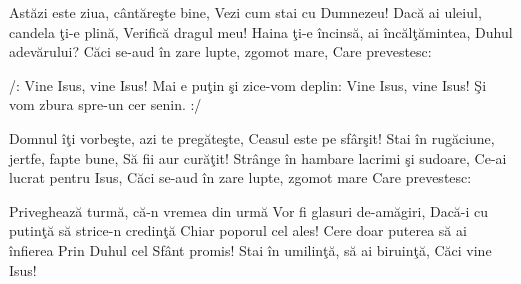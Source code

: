 
\beginverse
Astăzi este ziua, cântăreşte bine,
Vezi cum stai cu Dumnezeu!
Dacă ai uleiul, candela ţi-e plină,
Verifică dragul meu!
Haina ţi-e încinsă, ai încălţămintea,
Duhul adevărului?
Căci se-aud în zare lupte, zgomot mare,
Care prevestesc:
\endverse

\beginchorus
/: Vine Isus, vine Isus!
Mai e puţin şi zice-vom deplin:
Vine Isus, vine Isus!
Şi vom zbura spre-un cer senin. :/
\endchorus

\beginverse
Domnul îţi vorbeşte, azi te pregăteşte,
Ceasul este pe sfârşit!
Stai în rugăciune, jertfe, fapte bune,
Să fii aur curăţit!
Strânge în hambare lacrimi şi sudoare,
Ce-ai lucrat pentru Isus,
Căci se-aud în zare lupte, zgomot mare
Care prevestesc:
\endverse

\beginverse
Priveghează turmă, că-n vremea din urmă
Vor fi glasuri de-amăgiri,
Dacă-i cu putinţă să strice-n credinţă
Chiar poporul cel ales!
Cere doar puterea să ai înfierea
Prin Duhul cel Sfânt promis!
Stai în umilinţă, să ai biruinţă,
Căci vine Isus!
\endverse

\endsong